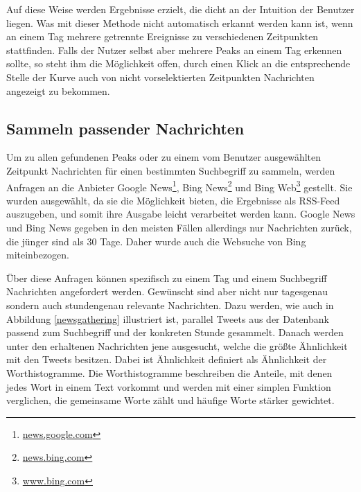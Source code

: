 Auf diese Weise werden Ergebnisse erzielt, die dicht an der Intuition der Benutzer liegen. Was mit dieser Methode nicht automatisch erkannt werden kann ist, wenn an einem Tag mehrere getrennte Ereignisse zu verschiedenen Zeitpunkten stattfinden. Falls der Nutzer selbst aber mehrere Peaks an einem Tag erkennen sollte, so steht ihm die Möglichkeit offen, durch einen Klick an die entsprechende Stelle der Kurve auch von nicht vorselektierten Zeitpunkten Nachrichten angezeigt zu bekommen.

\subsection{Sammeln passender Nachrichten}
Um zu allen gefundenen Peaks oder zu einem vom Benutzer ausgewählten Zeitpunkt Nachrichten für einen bestimmten Suchbegriff zu sammeln, werden Anfragen an die Anbieter Google News\footnote{\url{news.google.com}}, Bing News\footnote{\url{news.bing.com}} und Bing Web\footnote{\url{www.bing.com}} gestellt. Sie wurden ausgewählt, da sie die Möglichkeit bieten, die Ergebnisse als RSS-Feed auszugeben, und somit ihre Ausgabe leicht verarbeitet werden kann. Google News und Bing News gegeben in den meisten Fällen allerdings nur Nachrichten zurück, die jünger sind als 30 Tage. Daher wurde auch die Websuche von Bing miteinbezogen.

Über diese Anfragen können spezifisch zu einem Tag und einem Suchbegriff Nachrichten angefordert werden. Gewünscht sind aber nicht nur tagesgenau sondern auch stundengenau relevante Nachrichten. Dazu werden, wie auch in Abbildung \ref{newsgathering} illustriert ist, parallel Tweets aus der Datenbank passend zum Suchbegriff und der konkreten Stunde gesammelt. Danach werden unter den erhaltenen Nachrichten jene ausgesucht, welche die größte Ähnlichkeit mit den Tweets besitzen. Dabei ist Ähnlichkeit definiert als Ähnlichkeit der Worthistogramme. Die Worthistogramme beschreiben die Anteile, mit denen jedes Wort in einem Text vorkommt und werden mit einer simplen Funktion verglichen, die gemeinsame Worte zählt und häufige Worte stärker gewichtet.

